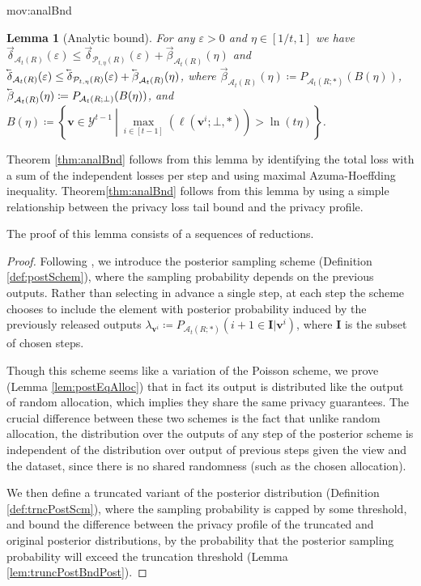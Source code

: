 \documentclass{article}
\newcommand{\mainThmAsym}{thm:analBnd}
\newcommand{\mainThmRec}{thm:analBnd}
\newcommand{\mainThmAsym}{thm:asymBnd}
\newcommand{\mainThmRec}{thm:recBnd}
\theoremstyle{plain}
\newtheorem{lemma}[theorem]{Lemma}
\theoremstyle{definition}
\newcommand{\eps}{\varepsilon}
\newcommand{\lvec}[1]{\reflectbox{$\vec{\reflectbox{$#1$}}$}}
\newcommand{\outDom}{\mathcal{Y}}
\newcommand{\rand}{R}
\newcommand{\view}{\boldsymbol{v}}
\newcommand{\loss}[3]{\ell\left(#1; #2, #3 \right)}
\newcommand{\Pois}[2]{\mathcal{P}_{#1}\left(#2\right)}
\newcommand{\alloc}[2]{\mathcal{A}_{#1}\left(#2\right)}
\newcommand{\allocFunc}[3]{\mathcal{A}_{#1}\left(#2; #3\right)}
\newcommand{\add}[1]{\lvec{#1}}
\newcommand{\rem}[1]{\vec{#1}}
\newcommand{\privProfAdd}[1]{\add{\delta}_{#1}}
\newcommand{\privProfRem}[1]{\rem{\delta}_{#1}}
\begin{document}
\begin{movable}{mov:analBnd}{}
\begin{lemma}[Analytic bound]\label{lem:analBnd}
    For any $\eps > 0$ and $\eta \in [1/t, 1]$ we have $\privProfRem{\alloc{t}{\rand}}(\eps) \le \privProfRem{\Pois{t, \eta}{\rand}}(\eps) + \rem{\beta}_{\alloc{t}{\rand}}(\eta)$ and $\privProfAdd{\alloc{t}{\rand}}(\eps) \le \privProfAdd{\Pois{t, \eta}{\rand}}(\eps) + \add{\beta}_{\alloc{t}{\rand}}(\eta)$,
    where $\rem{\beta}_{\alloc{t}{\rand}} (\eta) \coloneqq P_{\allocFunc{t}{\rand}{*}}(B(\eta))$, $\add{\beta}_{\alloc{t}{\rand}} (\eta) \coloneqq P_{\allocFunc{t}{\rand}{\bot}}(B(\eta))$, and $B(\eta) \coloneqq \left\{\view \in \outDom^{t-1} ~\left\vert~ \underset{i \in [t-1]}{\max} \left(\loss{\view^{i}}{\bot}{*} \right.\right) > \ln(t \eta) \right\}$.
\end{lemma}
Theorem \ref{\mainThmAsym} follows from this lemma by identifying the total loss with a sum of the independent losses per step and using maximal Azuma-Hoeffding inequality. Theorem\ref{\mainThmRec} follows from this lemma by using a simple relationship between the privacy loss tail bound and the privacy profile.


The proof of this lemma consists of a sequences of reductions.
\begin{proof}
    Following \citep{EFMRTT19}, we introduce the posterior sampling scheme (Definition \ref{def:postSchem}), where the sampling probability depends on the previous outputs. Rather than selecting in advance a single step, at each step the scheme chooses to include the element with posterior probability induced by the previously released outputs $\lambda_{\view^{i}} \coloneqq P_{\allocFunc{t}{\rand}{*}}\left(i+1 \in \boldsymbol{I} \vert \view^{i} \right)$, where $\boldsymbol{I}$ is the subset of chosen steps. 
    
    Though this scheme seems like a variation of the Poisson scheme, we prove (Lemma \ref{lem:postEqAlloc}) that in fact its output is distributed like the output of random allocation, which implies they share the same privacy guarantees. The crucial difference between these two schemes is the fact that unlike random allocation, the distribution over the outputs of any step of the posterior scheme is independent of the distribution over output of previous steps given the view and the dataset, since there is no shared randomness (such as the chosen allocation).

    We then define a truncated variant of the posterior distribution (Definition \ref{def:trncPostScm}), where the sampling probability is capped by some threshold, and bound the difference between the privacy profile of the truncated and original posterior distributions, by the probability that the posterior sampling probability will exceed the truncation threshold (Lemma \ref{lem:truncPostBndPost}).


\end{proof}
\end{movable}
\end{document}

